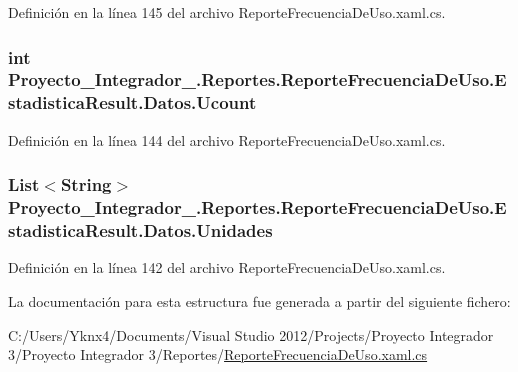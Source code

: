 Definición en la línea 145 del archivo Reporte\-Frecuencia\-De\-Uso.\-xaml.\-cs.

\hypertarget{struct_proyecto___integrador__3_1_1_reportes_1_1_reporte_frecuencia_de_uso_1_1_estadistica_result_1_1_datos_a7651dc7d0f1617da0643e61950bdb90f}{
\subsubsection[{Ucount}]{\setlength{\rightskip}{0pt plus 5cm}int Proyecto\-\_\-\-Integrador\-\_.\-Reportes.\-Reporte\-Frecuencia\-De\-Uso.\-Estadistica\-Result.\-Datos.\-Ucount}}\label{struct_proyecto___integrador__3_1_1_reportes_1_1_reporte_frecuencia_de_uso_1_1_estadistica_result_1_1_datos_a7651dc7d0f1617da0643e61950bdb90f}


Definición en la línea 144 del archivo Reporte\-Frecuencia\-De\-Uso.\-xaml.\-cs.

\hypertarget{struct_proyecto___integrador__3_1_1_reportes_1_1_reporte_frecuencia_de_uso_1_1_estadistica_result_1_1_datos_a81df80256c122959ba9bb1870d9085a5}{
\subsubsection[{Unidades}]{\setlength{\rightskip}{0pt plus 5cm}List$<$String$>$ Proyecto\-\_\-\-Integrador\-\_.\-Reportes.\-Reporte\-Frecuencia\-De\-Uso.\-Estadistica\-Result.\-Datos.\-Unidades}}\label{struct_proyecto___integrador__3_1_1_reportes_1_1_reporte_frecuencia_de_uso_1_1_estadistica_result_1_1_datos_a81df80256c122959ba9bb1870d9085a5}


Definición en la línea 142 del archivo Reporte\-Frecuencia\-De\-Uso.\-xaml.\-cs.



La documentación para esta estructura fue generada a partir del siguiente fichero\-:\begin{DoxyCompactItemize}
\item 
C\-:/\-Users/\-Yknx4/\-Documents/\-Visual Studio 2012/\-Projects/\-Proyecto Integrador 3/\-Proyecto Integrador 3/\-Reportes/\hyperlink{_reporte_frecuencia_de_uso_8xaml_8cs}{Reporte\-Frecuencia\-De\-Uso.\-xaml.\-cs}\end{DoxyCompactItemize}
